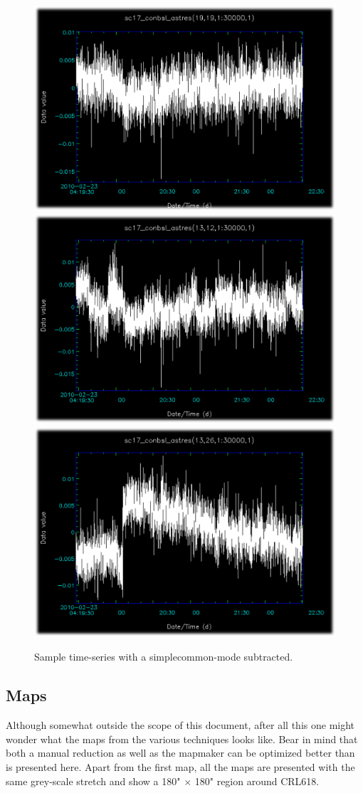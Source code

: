 \documentclass[twoside,11pt]{article}
\newcommand{\xlabel}[1]{}
\renewcommand{\_}{\texttt{\symbol{95}}}
\begin{document}
\begin{figure}
\begin{center}
\includegraphics[width=0.30\linewidth]{sc19_conbsl_astres_19_19}
\hspace{0.03\linewidth}
\includegraphics[width=0.30\linewidth]{sc19_conbsl_astres_13_12}
\hspace{0.03\linewidth}
\includegraphics[width=0.30\linewidth]{sc19_conbsl_astres_13_26}
\caption{Sample time-series with a simplecommon-mode subtracted.}
\label{fig:sampleastres}
\end{center}
\end{figure}
\subsection{\xlabel{samplemaps}Maps}
\label{sec:samplemaps}

Although somewhat outside the scope of this document, after all this
one might wonder what the maps from the various techniques looks like.
Bear in mind that both a manual reduction as well as the mapmaker can
be optimized better than is presented here. Apart from the first map,
all the maps are presented with the same grey-scale stretch and show a
180" $\times$ 180" region around CRL618.
\end{document}
